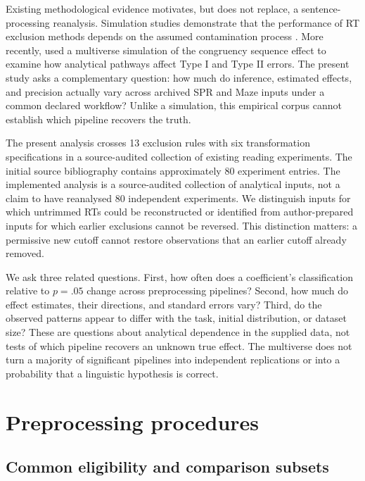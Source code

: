 Existing methodological evidence motivates, but does not replace, a
sentence-processing reanalysis. Simulation studies demonstrate that the
performance of RT exclusion methods depends on the assumed contamination
process \citep{ratcliff_methods_1993,berger_outliers_2021}. More recently,
\citet{bognar_multiverse_2025} used a multiverse simulation of the congruency
sequence effect to examine how analytical pathways affect Type I and Type II
errors. The present study asks a complementary question: how much do
inference, estimated effects, and precision actually vary across archived
SPR and Maze inputs under a common declared workflow? Unlike a simulation,
this empirical corpus cannot establish which pipeline recovers the truth.

The present analysis crosses 13 exclusion rules with six transformation
specifications in a source-audited collection of existing reading experiments.
The initial source bibliography contains approximately 80 experiment entries.
The implemented analysis is a source-audited collection of analytical inputs,
not a claim to have reanalysed 80 independent experiments. We distinguish inputs for which
untrimmed RTs could be reconstructed or identified from author-prepared
inputs for which earlier exclusions cannot be reversed. This distinction
matters: a permissive new cutoff cannot restore observations that an earlier
cutoff already removed.

We ask three related questions. First, how often does a coefficient's
classification relative to \(p=.05\) change across preprocessing pipelines?
Second, how much do effect estimates, their directions, and standard errors
vary? Third, do the observed patterns appear to differ with the task,
initial distribution, or dataset size? These are questions about analytical
dependence in the supplied data, not tests of which pipeline recovers an
unknown true effect. The multiverse does not turn a majority of significant
pipelines into independent replications or into a probability that a
linguistic hypothesis is correct.

\section{Preprocessing procedures}

\subsection{Common eligibility and comparison subsets}

